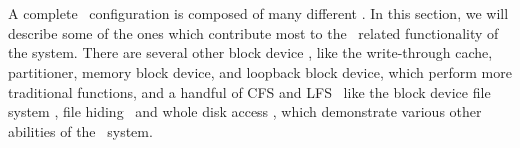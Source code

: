 \section{\Modules}
\label{sec:modules}


A complete \Kudos\ configuration is composed of many different \modules. In this
section, we will describe some of the ones which contribute most to the \chdesc\
related functionality of the system. There are several other block device
\modules, like the write-through cache, partitioner, memory block device, and
loopback block device, which perform more traditional functions, and a handful
of CFS and LFS \modules\ like the block device file system \module, file hiding
\module\, and whole disk access \module, which demonstrate various other
abilities of the \module\ system.




